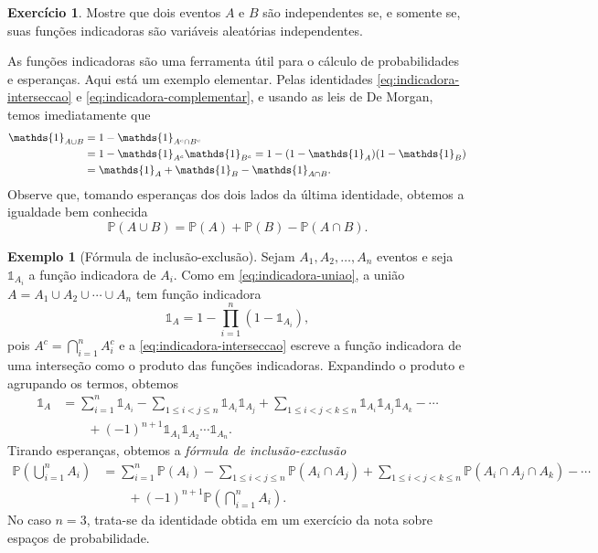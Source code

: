 \documentclass[12pt,portuguese]{article}
\theoremstyle{definition}
\newtheorem{example}[example]{Exemplo}
\newtheorem{exercise}{Exercício}
\begin{document}
\begin{exercise}\label{exercise:indicadoras-eventos}
Mostre que dois eventos $A$ e $B$ são independentes se, e somente se, suas
funções indicadoras são variáveis aleatórias independentes.
\end{exercise}

As funções indicadoras são uma ferramenta útil para o cálculo de
probabilidades e esperanças. Aqui está um exemplo elementar. 
Pelas identidades 
\eqref{eq:indicadora-interseccao} e \eqref{eq:indicadora-complementar}, e
usando as leis de De Morgan, temos imediatamente que
\begin{align}
\mathds{1}_{A \cup B}
&= 1 - \mathds{1}_{A^c \cap B^c} \notag \\
&= 1 - \mathds{1}_{A^c} \mathds{1}_{B^c}
= 1 - (1 - \mathds{1}_A)(1 - \mathds{1}_B) \notag \\
&= \mathds{1}_A + \mathds{1}_B - \mathds{1}_{A \cap B}
\label{eq:indicadora-uniao}.
\end{align}
Observe que, tomando esperanças dos dois lados da última identidade,
obtemos a igualdade bem conhecida 
\[
\mathbb{P}(A \cup B) = \mathbb{P}(A) + \mathbb{P}(B) -
\mathbb{P}(A \cap B).
\]

\begin{example}[Fórmula de inclusão-exclusão]\label{ex:inclusao-exclusao}
Sejam $A_1, A_2, \ldots, A_n$ eventos e seja $\mathds{1}_{A_i}$ a função
indicadora de $A_i$. Como em \eqref{eq:indicadora-uniao}, a união
$A = A_1 \cup A_2 \cup \cdots \cup A_n$ tem função indicadora
\[
\mathds{1}_A = 1 - \prod_{i=1}^{n} (1 - \mathds{1}_{A_i}),
\]
pois $A^c = \bigcap_{i=1}^{n} A_i^c$ e a
\eqref{eq:indicadora-interseccao} escreve a função indicadora de uma
interseção como o produto das funções indicadoras. Expandindo o produto e
agrupando os termos, obtemos
\[
\begin{aligned}
\mathds{1}_A
&= \sum_{i=1}^{n} \mathds{1}_{A_i} - \sum_{1\leqslant i<j\leqslant n} \mathds{1}_{A_i} \mathds{1}_{A_j}
+ \sum_{1\leqslant i<j<k\leqslant n} \mathds{1}_{A_i} \mathds{1}_{A_j} \mathds{1}_{A_k} - \cdots 
\\[0.2cm]
&\qquad + (-1)^{n+1} \mathds{1}_{A_1} \mathds{1}_{A_2} \cdots \mathds{1}_{A_n}.
\end{aligned}
\]
Tirando esperanças, obtemos a \emph{fórmula de inclusão-exclusão}
\[
\begin{aligned}
\mathbb{P}\left( \bigcup_{i=1}^{n} A_i \right)
&= \sum_{i=1}^{n} \mathbb{P}(A_i) - \sum_{1\leqslant i<j\leqslant n} \mathbb{P}(A_i \cap A_j)
+ \sum_{1\leqslant i<j<k\leqslant n} \mathbb{P}(A_i \cap A_j \cap A_k) - \cdots \\
&\qquad + (-1)^{n+1} \mathbb{P}\left( \bigcap_{i=1}^{n} A_i \right).
\end{aligned}
\]
No caso $n = 3$, trata-se da identidade obtida em um exercício da nota
sobre espaços de probabilidade.
\end{example}
\end{document}
